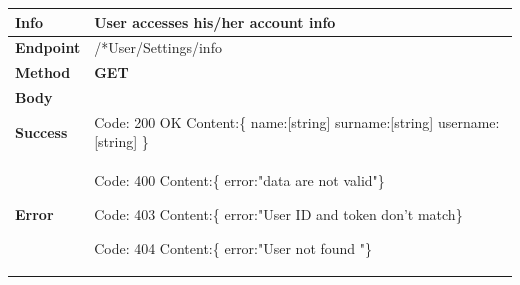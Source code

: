 


\begin{table}[H]
\begin{tabular}{|l|p{}|}
\hline
\textbf{Info}             & User accesses his/her account info                                                                      \\ \hline
\textbf{Endpoint}    &  /*User/Settings/info\\ \hline
\textbf{Method}         &   \textbf{GET}                                                                            \\ \hline

\textbf{Body}  &
                    \\ \hline
                    
\textbf{Success} &  Code: 200 OK \newline
                    Content:\{\newline 
                    name:[string]\newline
                 surname:[string]\newline
                 username:[string]\newline
                    \}\\ \hline
\textbf{Error} &  Code: 400 \newline
                  Content:\{\newline
                  error:"data are not valid"\newline\}\newline
                  
                  Code: 403 \newline
                  Content:\{\newline
                  error:"User ID and token don't match\newline\}\newline
                  
                  Code: 404 \newline
                  Content:\{\newline
                  error:"User not found "\newline\}\\\hline

\end{tabular}
\end{table}







